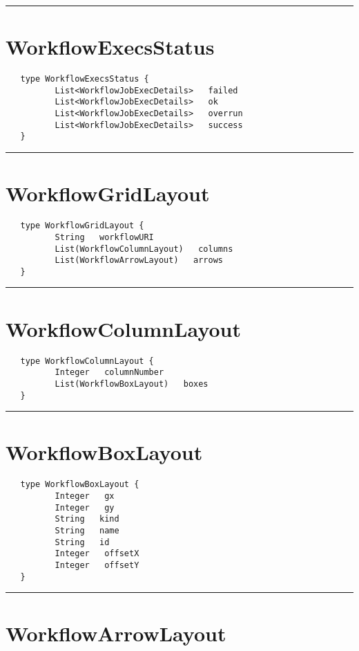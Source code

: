\rule{12cm}{2pt}
\section{WorkflowExecsStatus}
\label{type:WorkflowExecsStatus}

\begin{Verbatim}
   type WorkflowExecsStatus {
          List<WorkflowJobExecDetails>   failed
          List<WorkflowJobExecDetails>   ok
          List<WorkflowJobExecDetails>   overrun
          List<WorkflowJobExecDetails>   success
   }
\end{Verbatim}

\rule{12cm}{2pt}
\section{WorkflowGridLayout}
\label{type:WorkflowGridLayout}

\begin{Verbatim}
   type WorkflowGridLayout {
          String   workflowURI
          List(WorkflowColumnLayout)   columns
          List(WorkflowArrowLayout)   arrows
   }
\end{Verbatim}

\rule{12cm}{2pt}
\section{WorkflowColumnLayout}
\label{type:WorkflowColumnLayout}

\begin{Verbatim}
   type WorkflowColumnLayout {
          Integer   columnNumber
          List(WorkflowBoxLayout)   boxes
   }
\end{Verbatim}

\rule{12cm}{2pt}
\section{WorkflowBoxLayout}
\label{type:WorkflowBoxLayout}

\begin{Verbatim}
   type WorkflowBoxLayout {
          Integer   gx
          Integer   gy
          String   kind
          String   name
          String   id
          Integer   offsetX
          Integer   offsetY
   }
\end{Verbatim}

\rule{12cm}{2pt}
\section{WorkflowArrowLayout}
\label{type:WorkflowArrowLayout}

